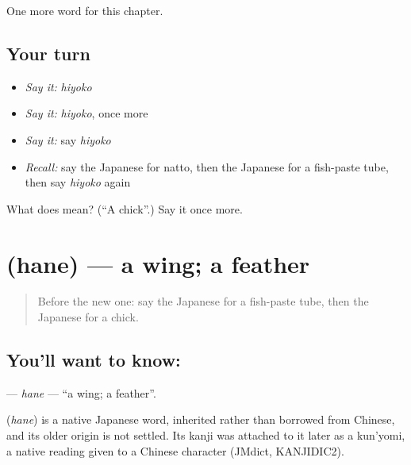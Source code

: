 \begin{grammarlens}[title={What you've built}]
One more word for this chapter.
\end{grammarlens}

\subsection*{Your turn}
\begin{itemize}
\raggedright
  \item \emph{Say it:} \emph{hiyoko}
  \item \emph{Say it:} \emph{hiyoko}, once more
  \item \emph{Say it:} say \emph{hiyoko}
  \item \emph{Recall:} say the Japanese for natto, then the Japanese for a fish-paste tube, then say \emph{hiyoko} again
\end{itemize}

\begin{tcolorbox}[breakable,colback=teal!4,colframe=teal!35!black,title={Before you move on}]
What does  mean? (\textquotedblleft{}A chick\textquotedblright{}.) Say it once more.
\end{tcolorbox}
\section[\texorpdfstring{\ja{はね} (hane)}{はね (hane)}]{ (hane) — a wing; a feather}

\label{lesson:JA-C70-hane}



\begin{quote}
Before the new one: say the Japanese for a fish-paste tube, then the Japanese for a chick.
\end{quote}

\subsection*{You'll want to know: }
\textbf{} — \emph{hane} — \textquotedblleft{}a wing; a feather\textquotedblright{}.

\begin{cousinweb}
\textbf{} (\emph{hane}) is a native Japanese word, inherited rather than borrowed from Chinese, and its older origin is not settled. Its kanji was attached to it later as a kun'yomi, a native reading given to a Chinese character (JMdict, KANJIDIC2).
\end{cousinweb}

